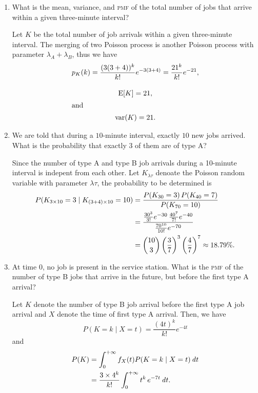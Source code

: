 \begin{enumerate}
  \begin{enumerate} \parasp
  \item What is the mean, variance, and \textsc{pmf} of the total
    number of jobs that arrive within a given three-minute interval?

    Let \(K\) be the total number of job arrivals within a given
    three-minute interval.  The merging of two Poisson process is
    another Poisson process with parameter \(\lambda_A + \lambda_B\),
    thus we have
    \begin{gather*}
      p_K(k) = \frac{(3(3+4))^k}{k!} e^{-3(3+4)} = \frac{21^k}{k!} e^{-21}, \\[1em]
      \operatorname{E}[K] = 21, \\
      \intertext{and}
      \operatorname{var}(K) = 21.
    \end{gather*}

  \item We are told that during a \(10\)-minute interval, exactly \(10\) new
    jobs arrived.  What is the probability that exactly \(3\) of them are
    of type A?

    Since the number of type A and type B job arrivals during a 10-minute
    interval is indepent from each other.  Let \(K_{\lambda \tau}\)
    denoate the Poisson random variable with parameter \(\lambda \tau\), the
    probability to be determined is
    \begin{align*}
      P(K_{3\times10} = 3 \mid K_{(3+4)\times10} = 10)
      &= \frac{P(K_{30} = 3) \, P(K_{40} = 7)}{P(K_{70} = 10)} \\
      &= \frac{\frac{30^{3}}{3!} e^{-30} \, \frac{40^{7}}{7!} e^{-40}}{\frac{70^{10}}{10!} e^{-70}} \\
      &= \binom{10}{3} \left( \frac37 \right)^3 \left( \frac47 \right)^7 \approx 18.79\%.
    \end{align*}

  \item At time \(0\), no job is present in the service station.  What is
    the \textsc{pmf} of the number of type B jobs that arrive in the
    future, but before the first type A arrival?

    Let \(K\) denote the number of type B job arrival before the first
    type A job arrival and \(X\) denote the time of first type A arrival.
    Then, we have
    \[P(K=k \mid X=t) = \frac{(4t)^k}{k!} e^{-4t}\]
    and
    \begin{align*}
      P(K) &= \int_0^{+\infty} f_X(t) P(K=k \mid X=t) \mathop{}\!\mathit{d} t \\
           &= \frac{3 \times 4^k}{k!} \int_0^{+\infty} t^k \, e^{-7t} \mathop{}\!\mathit{d} t.
    \end{align*}
  \end{enumerate}


\end{enumerate}
